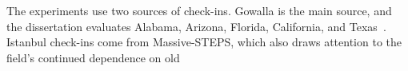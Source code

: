 The experiments use two sources of check-ins. Gowalla is the main source, and the
dissertation evaluates Alabama, Arizona, Florida, California, and
Texas~\cite{cho2011gowalla}. Istanbul check-ins come from Massive-STEPS, which also
draws attention to the field's continued dependence on old

